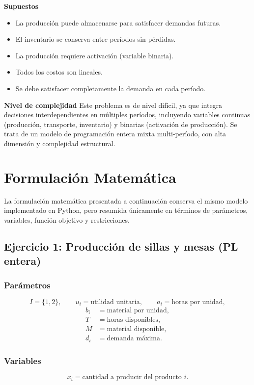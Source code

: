 \documentclass[12pt,letterpaper]{article}
\begin{document}
\textbf{Supuestos}
\begin{itemize}[leftmargin=*]
	\item La producción puede almacenarse para satisfacer demandas futuras.
	\item El inventario se conserva entre períodos sin pérdidas.
	\item La producción requiere activación (variable binaria).
	\item Todos los costos son lineales.
	\item Se debe satisfacer completamente la demanda en cada período.
\end{itemize}

\textbf{Nivel de complejidad} Este problema es de nivel difícil, ya que integra decisiones interdependientes en múltiples períodos, incluyendo variables continuas (producción, transporte, inventario) y binarias (activación de producción). Se trata de un modelo de programación entera mixta multi-período, con alta dimensión y complejidad estructural.

\section{Formulación Matemática}

La formulación matemática presentada a continuación conserva el mismo modelo implementado en Python, pero resumida únicamente en términos de parámetros, variables, función objetivo y restricciones.

\subsection{Ejercicio 1: Producción de sillas y mesas (PL entera)}

\subsubsection*{Parámetros}
\[
I=\{1,2\},\qquad
u_i=\text{utilidad unitaria},\qquad
a_i=\text{horas por unidad},
\]
\begin{align*}
b_i&=\text{material por unidad},\\
T&=\text{horas disponibles},\\
M&=\text{material disponible},\\
d_i&=\text{demanda máxima}.
\end{align*}

\subsubsection*{Variables}
\[
x_i=\text{cantidad a producir del producto } i.
\]
\end{document}
